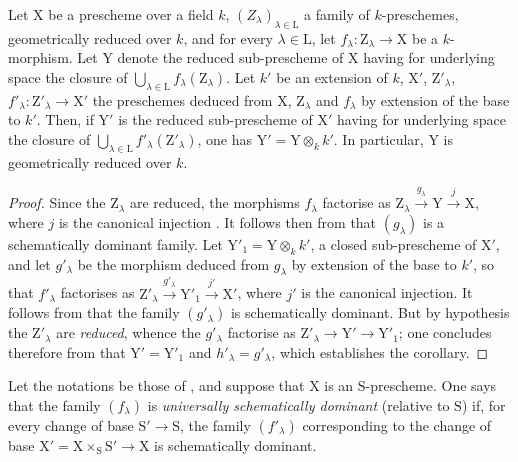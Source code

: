 \begin{corollary}[11.10.7]
\label{IV.11.10.7}
Let $\mathrm{X}$ be a prescheme over a field $k$, $(Z_\lambda)_{\lambda\in\mathrm{L}}$ a family of $k$-preschemes, geometrically reduced over $k$, and for every $\lambda\in\mathrm{L}$, let $f_\lambda:\mathrm{Z}_\lambda\to\mathrm{X}$ be a $k$-morphism.
Let $\mathrm{Y}$ denote the reduced sub-prescheme of $\mathrm{X}$ having for underlying space the closure of $\bigcup_{\lambda\in\mathrm{L}}f_\lambda(\mathrm{Z}_\lambda)$.
Let $k'$ be an extension of $k$, $\mathrm{X}'$, $\mathrm{Z}'_\lambda$, $f'_\lambda:\mathrm{Z}'_\lambda\to\mathrm{X}'$ the preschemes deduced from $\mathrm{X}$, $\mathrm{Z}_\lambda$ and $f_\lambda$ by extension of the base to $k'$.
Then, if $\mathrm{Y}'$ is the reduced sub-prescheme of $\mathrm{X}'$ having for underlying space the closure of $\bigcup_{\lambda\in\mathrm{L}}f'_\lambda(\mathrm{Z}'_\lambda)$, one has $\mathrm{Y}'=\mathrm{Y}\otimes_k k'$.
In particular, $\mathrm{Y}$ is geometrically reduced over $k$.
\end{corollary}

\begin{proof}
Since the $\mathrm{Z}_\lambda$ are reduced, the morphisms $f_\lambda$ factorise as $\mathrm{Z}_\lambda\xrightarrow{g_\lambda}\mathrm{Y}\xrightarrow{j}\mathrm{X}$, where $j$ is the canonical injection .
It follows then from  that $(g_\lambda)$ is a schematically dominant family.
Let $\mathrm{Y}'_1=\mathrm{Y}\otimes_k k'$, a closed sub-prescheme of $\mathrm{X}'$, and let $g'_\lambda$ be the morphism deduced from $g_\lambda$ by extension of the base to $k'$, so that $f'_\lambda$ factorises as $\mathrm{Z}'_\lambda\xrightarrow{g'_\lambda}\mathrm{Y}'_1\xrightarrow{j'}\mathrm{X}'$, where $j'$ is the canonical injection.
It follows from  that the family $(g'_\lambda)$ is schematically dominant.
But by hypothesis the $\mathrm{Z}'_\lambda$ are \emph{reduced}, whence  the $g'_\lambda$ factorise as $\mathrm{Z}'_\lambda\to\mathrm{Y}'\to\mathrm{Y}'_1$; one concludes therefore from  that $\mathrm{Y}'=\mathrm{Y}'_1$ and $h'_\lambda=g'_\lambda$, which establishes the corollary.
\end{proof}

\begin{definition}[11.10.8]
\label{IV.11.10.8}
Let the notations be those of , and suppose that $\mathrm{X}$ is an $\mathrm{S}$-prescheme.
One says that the family $(f_\lambda)$ is \emph{universally schematically dominant} (relative to $\mathrm{S}$) if, for every change of base $\mathrm{S}'\to\mathrm{S}$, the family $(f'_\lambda)$ corresponding to the change of base $\mathrm{X}'=\mathrm{X}\times_\mathrm{S}\mathrm{S}'\to\mathrm{X}$ is schematically dominant.
\end{definition}

